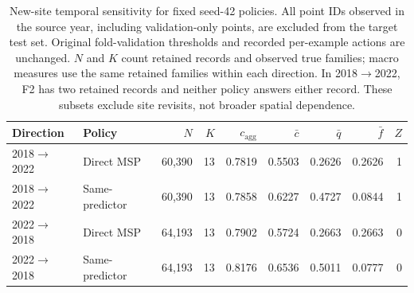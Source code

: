 \begin{table}[htbp]
\centering\footnotesize
\setlength{\tabcolsep}{3pt}
\caption{New-site temporal sensitivity for fixed seed-42 policies. All point IDs observed in the source year, including validation-only points, are excluded from the target test set. Original fold-validation thresholds and recorded per-example actions are unchanged. $N$ and $K$ count retained records and observed true families; macro measures use the same retained families within each direction. In 2018$\to$2022, F2 has two retained records and neither policy answers either record. These subsets exclude site revisits, not broader spatial dependence.}\label{tab:supp-new-site-temporal}
\begin{tabular}{llrrrrrrr}
\toprule
Direction & Policy & $N$ & $K$ & $c_{\mathrm{agg}}$ & $\bar c$ & $\bar q$ & $\bar f$ & $Z$ \\
\midrule
2018$\to$2022 & Direct MSP & 60,390 & 13 & 0.7819 & 0.5503 & 0.2626 & 0.2626 & 1 \\
2018$\to$2022 & Same-predictor & 60,390 & 13 & 0.7858 & 0.6227 & 0.4727 & 0.0844 & 1 \\
2022$\to$2018 & Direct MSP & 64,193 & 13 & 0.7902 & 0.5724 & 0.2663 & 0.2663 & 0 \\
2022$\to$2018 & Same-predictor & 64,193 & 13 & 0.8176 & 0.6536 & 0.5011 & 0.0777 & 0 \\
\bottomrule
\end{tabular}
\end{table}
